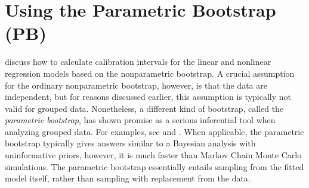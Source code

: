 \documentclass[useAMS,usenatbib,usegraphicx,referee]{biom}\usepackage[]{graphicx}\usepackage[]{color}
\begin{document}
\section{Using the Parametric Bootstrap (PB)}
\label{sec:parametric}
\citet{jones_bootstrapping_1999} discuss how to calculate calibration intervals for the linear and nonlinear regression models based on the nonparametric bootstrap. A crucial assumption for the ordinary nonparametric bootstrap, however, is that the data are independent, but for reasons discussed earlier, this assumption is typically not valid for grouped data. Nonetheless, a different kind of bootstrap, called the \textit{parametric bootstrap}, has shown promise as a serious inferential tool when analyzing grouped data. For examples, see  \citet[pg.342]{mcculloch_generalized_2008} and \citet{efron_bootstrap_2011}. When applicable, the parametric bootstrap typically gives answers similar to a Bayesian analysis with uninformative priors, however, it is much faster than Markov Chain Monte Carlo simulations. The parametric bootstrap essentially entails sampling from the fitted model itself, rather than sampling with replacement from the data. 
\end{document}
